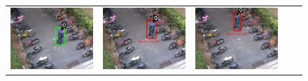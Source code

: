 \begin{frame}
\begin{figure}[t]
\begin{tabular}{ccccc}
            \includegraphics[scale=0.17]{figures/case-1-suspicious-0225} &
            \includegraphics[scale=0.17]{figures/case-1-suspicious-0249} &
            \includegraphics[scale=0.17]{figures/case-1-suspicious-0267} \\

\end{tabular}
\end{figure}
\end{frame}
